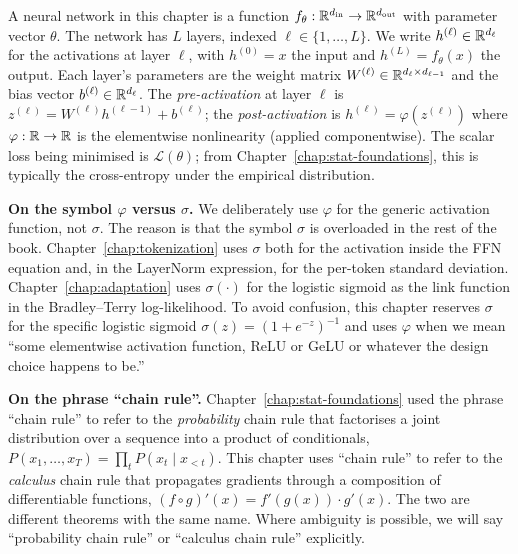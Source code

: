 \begin{notationbox}
A neural network in this chapter is a function
$f_\theta : \mathbb{R}^{d_{\mathrm{in}}} \to \mathbb{R}^{d_{\mathrm{out}}}$
with parameter vector $\theta$. The network has $L$ layers, indexed
$\ell \in \{1, \dots, L\}$. We write $h^{(\ell)} \in \mathbb{R}^{d_\ell}$
for the activations at layer $\ell$, with $h^{(0)} = x$ the input
and $h^{(L)} = f_\theta(x)$ the output. Each layer's parameters are
the weight matrix $W^{(\ell)} \in \mathbb{R}^{d_\ell \times d_{\ell-1}}$
and the bias vector $b^{(\ell)} \in \mathbb{R}^{d_\ell}$. The
\emph{pre-activation} at layer $\ell$ is
$z^{(\ell)} = W^{(\ell)} h^{(\ell-1)} + b^{(\ell)}$; the
\emph{post-activation} is
$h^{(\ell)} = \varphi(z^{(\ell)})$ where $\varphi : \mathbb{R} \to \mathbb{R}$ is
the elementwise nonlinearity (applied componentwise). The scalar
loss being minimised is $\mathcal{L}(\theta)$; from Chapter~\ref{chap:stat-foundations}, this
is typically the cross-entropy under the empirical distribution.

\textbf{On the symbol $\varphi$ versus $\sigma$.}
We deliberately use $\varphi$ for the generic activation function,
not $\sigma$. The reason is that the symbol $\sigma$ is overloaded
in the rest of the book. Chapter~\ref{chap:tokenization} uses $\sigma$ both for the
activation inside the FFN equation and, in the LayerNorm
expression, for the per-token standard deviation. Chapter~\ref{chap:adaptation} uses
$\sigma(\cdot)$ for the logistic sigmoid as the link function in
the Bradley--Terry log-likelihood. To avoid confusion, this
chapter reserves $\sigma$ for the specific logistic sigmoid
$\sigma(z) = (1 + e^{-z})^{-1}$ and uses $\varphi$ when we mean
``some elementwise activation function, ReLU or GeLU or whatever
the design choice happens to be.''

\textbf{On the phrase ``chain rule''.}
Chapter~\ref{chap:stat-foundations} used the phrase ``chain rule'' to refer to the
\emph{probability} chain rule that factorises a joint distribution
over a sequence into a product of conditionals,
$P(x_1, \dots, x_T) = \prod_t P(x_t \mid x_{<t})$. This chapter
uses ``chain rule'' to refer to the \emph{calculus} chain rule
that propagates gradients through a composition of differentiable
functions, $(f \circ g)'(x) = f'(g(x)) \cdot g'(x)$. The two are
different theorems with the same name. Where ambiguity is
possible, we will say ``probability chain rule'' or ``calculus
chain rule'' explicitly.


\end{notationbox}
